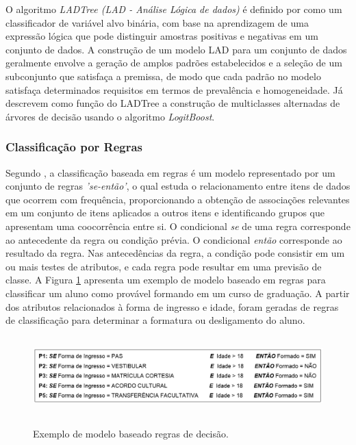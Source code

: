 O algoritmo \textit{LADTree (LAD - Análise Lógica de dados)} é definido por \citet{wisaeng} como um classificador de variável alvo binária, com base na aprendizagem de uma expressão  lógica que pode distinguir amostras positivas e negativas em um conjunto de dados. A construção de um modelo LAD para um conjunto de dados geralmente envolve a geração de amplos padrões estabelecidos e a seleção de um subconjunto que satisfaça a premissa, de modo que cada padrão no modelo satisfaça determinados requisitos em termos de prevalência e homogeneidade. Já \citet{witten2005} descrevem como função do LADTree a construção de multiclasses alternadas de árvores de decisão usando o algoritmo \textit{LogitBoost}.




\subsubsection{Classificação por Regras} \label{3subsubtitle2}

Segundo \citet{han_kamber2006}, a classificação baseada em regras é um modelo representado por um conjunto de regras \textit{'se-então'}, o qual estuda o relacionamento entre itens de dados que ocorrem com frequência, proporcionando a obtenção de associações relevantes em um conjunto de itens aplicados a outros itens e identificando grupos que apresentam uma coocorrência entre si. O condicional \textit{se} de uma regra corresponde ao antecedente da regra ou condição prévia. O condicional \textit{então} corresponde ao resultado da regra. Nas antecedências da regra, a condição pode consistir em um ou mais testes de atributos, e cada regra  pode resultar em uma previsão de classe. A Figura \ref{regras_classificacao} apresenta um exemplo de modelo baseado em regras para classificar um aluno como provável formando em um curso de graduação. A partir dos atributos relacionados à forma de ingresso e idade, foram geradas de regras de classificação para determinar a formatura ou desligamento do aluno.

\begin{figure}[!htb]
	\centering
	{\includegraphics[width=14cm, height=3cm]{images/imagem8}}
	\caption {Exemplo de modelo baseado regras de decisão.}
	\label{regras_classificacao}
\end{figure}

